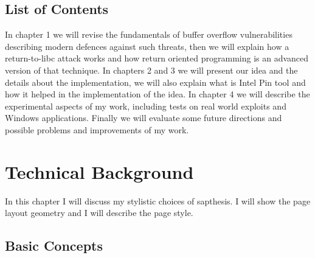 \documentclass[Lau,binding=0.6cm]{sapthesis}
\begin{document}
\section*{List of Contents}
In chapter 1 we will revise the fundamentals of buffer overflow vulnerabilities describing modern defences against such threats, then we will explain how a return-to-libc attack works and how return oriented programming is an advanced version of that technique. In chapters 2 and 3 we will present our idea and the details about the implementation, we will also explain what is Intel Pin tool and how it helped in the implementation of the idea. In chapter 4 we will describe the experimental aspects of my work, including tests on real world exploits and Windows applications. Finally we will evaluate some future directions and possible problems and improvements of my work.

\mainmatter

\chapter{Technical Background}

In this chapter I will discuss my stylistic choices of \textsf{sapthesis}.
I will show the page layout geometry and I will describe the page style.

\section{Basic Concepts}
\end{document}
